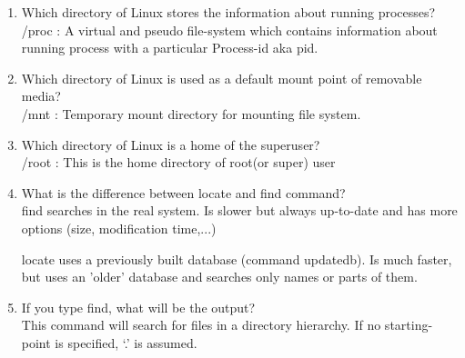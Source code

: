 \documentclass[12pt,a4]{article}
\begin{document}
\begin{enumerate}
\item  Which directory of Linux stores the information about running processes?\\
/proc : A virtual and pseudo file-system which contains information about running process with a particular Process-id aka pid.
\item Which directory of Linux is used as a default mount point of removable media?\\
/mnt : Temporary mount directory for mounting file system.
\item Which directory of Linux is a home of the superuser?\\
/root : This is the home directory of root(or super) user 
\item  What is the difference between locate and find command?\\
find searches in the real system. Is slower but always up-to-date and has more options (size, modification time,...)
\par
locate uses a previously built database (command updatedb). Is much faster, but uses an 'older' database and searches only names or parts of them.
\item  If you type find, what will be the output?\\
This command will search for files in a directory hierarchy. If no starting-point is
specified, `.' is assumed.



\end{enumerate}
\end{document}
